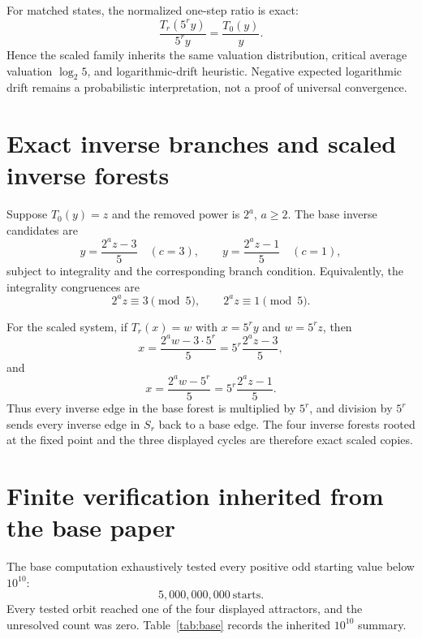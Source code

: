 \documentclass[11pt]{article}
\begin{document}
For matched states, the normalized one-step ratio is exact:
\begin{equation}
\frac{T_r(5^ry)}{5^ry}=\frac{T_0(y)}y.
\label{eq:ratioexact}
\end{equation}
Hence the scaled family inherits the same valuation distribution, critical average valuation $\log_2 5$, and logarithmic-drift heuristic. Negative expected logarithmic drift remains a probabilistic interpretation, not a proof of universal convergence.

\section{Exact inverse branches and scaled inverse forests}
Suppose $T_0(y)=z$ and the removed power is $2^a$, $a\ge2$. The base inverse candidates are
\begin{equation}
y=\frac{2^az-3}{5}\quad(c=3),
\qquad
y=\frac{2^az-1}{5}\quad(c=1),
\label{eq:baseinv}
\end{equation}
subject to integrality and the corresponding branch condition. Equivalently, the integrality congruences are
\[
2^az\equiv3\pmod5,
\qquad
2^az\equiv1\pmod5.
\]

For the scaled system, if $T_r(x)=w$ with $x=5^ry$ and $w=5^rz$, then
\begin{equation}
x=\frac{2^aw-3\cdot5^r}{5}
=5^r\frac{2^az-3}{5},
\label{eq:scaledinv3}
\end{equation}
and
\begin{equation}
x=\frac{2^aw-5^r}{5}
=5^r\frac{2^az-1}{5}.
\label{eq:scaledinv1}
\end{equation}
Thus every inverse edge in the base forest is multiplied by $5^r$, and division by $5^r$ sends every inverse edge in $S_r$ back to a base edge. The four inverse forests rooted at the fixed point and the three displayed cycles are therefore exact scaled copies.

\section{Finite verification inherited from the base paper}
The base computation exhaustively tested every positive odd starting value below $10^{10}$:
\[
5,000,000,000\ \text{starts}.
\]
Every tested orbit reached one of the four displayed attractors, and the unresolved count was zero. Table~\ref{tab:base} records the inherited $10^{10}$ summary.
\end{document}
